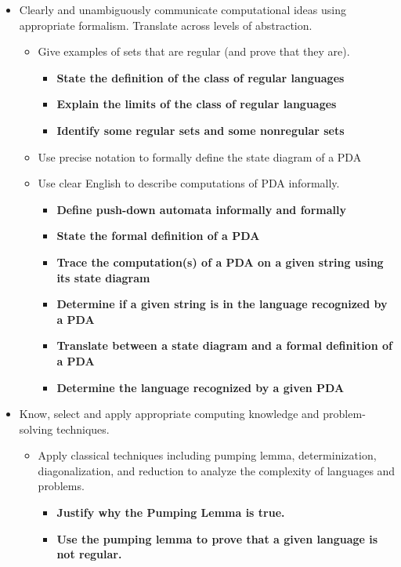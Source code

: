 \begin{itemize}
    \item Clearly and unambiguously communicate computational ideas using appropriate formalism. Translate across levels of abstraction.
    \begin{itemize}
       \item Give examples of sets that are regular (and prove that they are).
       \begin{itemize}
          \item {\bf State the definition of the class of regular languages}
          \item {\bf Explain the limits of the class of regular languages}
          \item {\bf Identify some regular sets and some nonregular sets}
       \end{itemize}
       \item Use precise notation to formally define the state diagram of a PDA
       \item Use clear English to describe computations of PDA informally.
       \begin{itemize}
           \item {\bf Define push-down automata informally and formally}
           \item {\bf State the formal definition of a PDA}
           \item {\bf Trace the computation(s) of a PDA on a given string using its state diagram}
           \item {\bf Determine if a given string is in the language recognized by a PDA}
           \item {\bf Translate between a state diagram and a formal deﬁnition of a PDA}
           \item {\bf Determine the language recognized by a given PDA}
        \end{itemize}

    \end{itemize}

    \item Know, select and apply appropriate computing knowledge and problem-solving techniques. 
    \begin{itemize}
    \item Apply classical techniques including pumping lemma, determinization, diagonalization, and reduction to analyze the complexity of languages and problems.
    \begin{itemize}
        \item {\bf Justify why the Pumping Lemma is true.}
        \item {\bf Use the pumping lemma to prove that a given language is not regular.}
    \end{itemize}
    \end{itemize}
\end{itemize}

